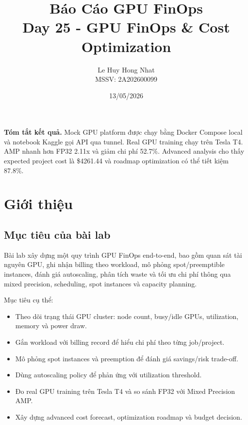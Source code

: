 \documentclass[12pt,a4paper]{article}
\title{
  \vspace{-1.5cm}
  \textbf{\Huge Báo Cáo GPU FinOps}\\
  \vspace{0.3cm}
  \Large Day 25 - GPU FinOps \& Cost Optimization
}
\author{Le Huy Hong Nhat \\ MSSV: 2A202600099}
\date{13/05/2026}
\begin{document}
\maketitle
\thispagestyle{empty}

\begin{center}
\colorbox{LightBox}{
  \begin{minipage}{0.92\textwidth}
  \textbf{Tóm tắt kết quả.}
  Mock GPU platform được chạy bằng Docker Compose local và notebook Kaggle gọi API qua tunnel.
  Real GPU training chạy trên Tesla T4. AMP nhanh hơn FP32 2.11x và giảm chi phí 52.7\%.
  Advanced analysis cho thấy expected project cost là \$4261.44 và roadmap optimization có thể tiết kiệm 87.8\%.
  \end{minipage}
}
\end{center}

\vspace{0.5cm}
\tableofcontents
\newpage

\section{Giới thiệu}

\subsection{Mục tiêu của bài lab}

Bài lab xây dựng một quy trình GPU FinOps end-to-end, bao gồm quan sát tài nguyên GPU,
ghi nhận billing theo workload, mô phỏng spot/preemptible instances, đánh giá autoscaling,
phân tích waste và tối ưu chi phí thông qua mixed precision, scheduling, spot instances
và capacity planning.

Mục tiêu cụ thể:
\begin{itemize}
  \item Theo dõi trạng thái GPU cluster: node count, busy/idle GPUs, utilization, memory và power draw.
  \item Gắn workload với billing record để hiểu chi phí theo từng job/project.
  \item Mô phỏng spot instances và preemption để đánh giá savings/risk trade-off.
  \item Dùng autoscaling policy để phản ứng với utilization threshold.
  \item Đo real GPU training trên Tesla T4 và so sánh FP32 với Mixed Precision AMP.
  \item Xây dựng advanced cost forecast, optimization roadmap và budget decision.
\end{itemize}
\end{document}
